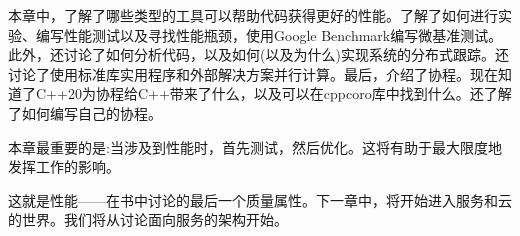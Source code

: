 本章中，了解了哪些类型的工具可以帮助代码获得更好的性能。了解了如何进行实验、编写性能测试以及寻找性能瓶颈，使用Google Benchmark编写微基准测试。此外，还讨论了如何分析代码，以及如何(以及为什么)实现系统的分布式跟踪。还讨论了使用标准库实用程序和外部解决方案并行计算。最后，介绍了协程。现在知道了C++20为协程给C++带来了什么，以及可以在cppcoro库中找到什么。还了解了如何编写自己的协程。

本章最重要的是:当涉及到性能时，首先测试，然后优化。这将有助于最大限度地发挥工作的影响。

这就是性能——在书中讨论的最后一个质量属性。下一章中，将开始进入服务和云的世界。我们将从讨论面向服务的架构开始。
























